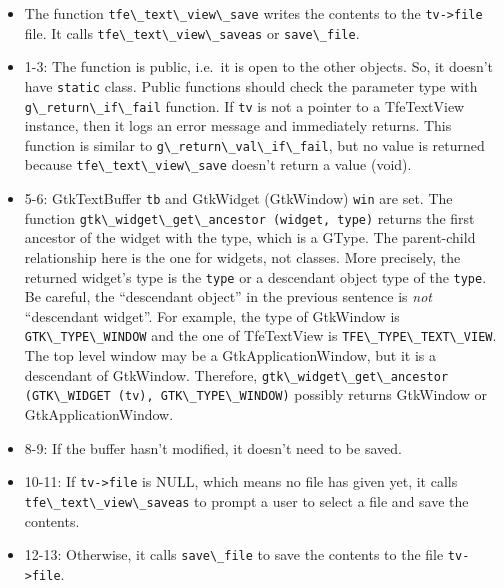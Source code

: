 \begin{itemize}
\tightlist
\item
  The function \passthrough{\lstinline!tfe\_text\_view\_save!} writes
  the contents to the \passthrough{\lstinline!tv->file!} file. It calls
  \passthrough{\lstinline!tfe\_text\_view\_saveas!} or
  \passthrough{\lstinline!save\_file!}.
\item
  1-3: The function is public, i.e.~it is open to the other objects. So,
  it doesn't have \passthrough{\lstinline!static!} class. Public
  functions should check the parameter type with
  \passthrough{\lstinline!g\_return\_if\_fail!} function. If
  \passthrough{\lstinline!tv!} is not a pointer to a TfeTextView
  instance, then it logs an error message and immediately returns. This
  function is similar to
  \passthrough{\lstinline!g\_return\_val\_if\_fail!}, but no value is
  returned because \passthrough{\lstinline!tfe\_text\_view\_save!}
  doesn't return a value (void).
\item
  5-6: GtkTextBuffer \passthrough{\lstinline!tb!} and GtkWidget
  (GtkWindow) \passthrough{\lstinline!win!} are set. The function
  \passthrough{\lstinline!gtk\_widget\_get\_ancestor (widget, type)!}
  returns the first ancestor of the widget with the type, which is a
  GType. The parent-child relationship here is the one for widgets, not
  classes. More precisely, the returned widget's type is the
  \passthrough{\lstinline!type!} or a descendant object type of the
  \passthrough{\lstinline!type!}. Be careful, the ``descendant object''
  in the previous sentence is \emph{not} ``descendant widget''. For
  example, the type of GtkWindow is
  \passthrough{\lstinline!GTK\_TYPE\_WINDOW!} and the one of TfeTextView
  is \passthrough{\lstinline!TFE\_TYPE\_TEXT\_VIEW!}. The top level
  window may be a GtkApplicationWindow, but it is a descendant of
  GtkWindow. Therefore,
  \passthrough{\lstinline!gtk\_widget\_get\_ancestor (GTK\_WIDGET (tv), GTK\_TYPE\_WINDOW)!}
  possibly returns GtkWindow or GtkApplicationWindow.
\item
  8-9: If the buffer hasn't modified, it doesn't need to be saved.
\item
  10-11: If \passthrough{\lstinline!tv->file!} is NULL, which means no
  file has given yet, it calls
  \passthrough{\lstinline!tfe\_text\_view\_saveas!} to prompt a user to
  select a file and save the contents.
\item
  12-13: Otherwise, it calls \passthrough{\lstinline!save\_file!} to
  save the contents to the file \passthrough{\lstinline!tv->file!}.
\end{itemize}

